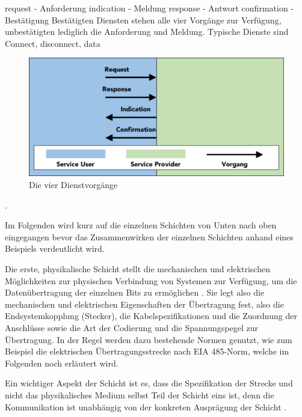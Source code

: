 request - Anforderung
indication - Meldung
response - Antwort
confirmation - Bestätigung
Bestätigten Diensten stehen alle vier Vorgänge zur Verfügung, unbestätigten lediglich die Anforderung und Meldung.
Typische Dienste sind Connect, disconnect, data

\begin{figure}
\centering
\includegraphics[width=\textwidth]{abbildungen/20160310_vorgang}
\caption{Die vier Dienstvorgänge}
\label{fig:vorgang}
\end{figure}

\cite[S.~14f.]{schn06}.

Im Folgenden wird kurz auf die einzelnen Schichten von Unten nach oben eingegangen bevor das Zusammenwirken der einzelnen Schichten anhand eines Beispiels verdeutlicht wird. %

Die erste, physikalische Schicht stellt die mechanischen und elektrischen Möglichkeiten zur physischen Verbindung von Systemen zur Verfügung, um die Datenübertragung der einzelnen Bits zu ermöglichen \cite[S.~49f.]{osi96}. Sie legt also die mechanischen und elektrischen Eigenschaften der Übertragung fest, also die Endsystemkopplung (Stecker), die Kabelspezifikationen und die Zuordnung der Anschlüsse sowie die Art der Codierung und die Spannungspegel zur Übertragung. In der Regel werden dazu bestehende Normen genutzt, wie zum Beispiel die elektrischen Übertragungsstrecke nach EIA 485-Norm, welche im Folgenden noch erläutert wird.

Ein wichtiger Aspekt der Schicht ist es, dass die Spezifikation der Strecke und nicht das physikalisches Medium selbst Teil der Schicht eins ist, denn die Kommunikation ist unabhängig von der konkreten Ausprägung der Schicht \cite[S.~9]{schn06}.

